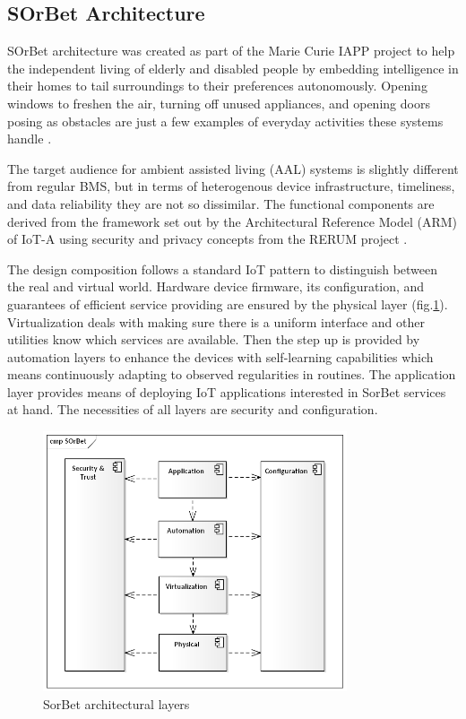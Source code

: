 \documentclass[11pt, english, a4paper, twoside]{article}
\begin{document}
\subsection{SOrBet Architecture}
SOrBet architecture was created as part of the Marie Curie IAPP project to help the independent living of elderly and disabled people by embedding intelligence in their homes to tail surroundings to their preferences autonomously. Opening windows to freshen the air, turning off unused appliances, and opening doors posing as obstacles are just a few examples of everyday activities these systems handle \cite{tragos_iot_2015}.

The target audience for ambient assisted living (AAL) systems is slightly different from regular BMS, but in terms of heterogenous device infrastructure, timeliness, and data reliability they are not so dissimilar. The functional components are derived from the framework set out by the Architectural Reference Model (ARM) of IoT-A using security and privacy concepts from the RERUM project \cite{rerum}.

The design composition follows a standard IoT pattern to distinguish between the real and virtual world. Hardware device firmware, its configuration, and guarantees of efficient service providing are ensured by the physical layer (fig.\ref{fig:sorbet}). Virtualization deals with making sure there is a uniform interface and other utilities know which services are available. Then the step up is provided by automation layers to enhance the devices with self-learning capabilities which means continuously adapting to observed regularities in routines. The application layer provides means of deploying IoT applications interested in SorBet services at hand. The necessities of all layers are security and configuration.

\begin{figure}
	\centering
	\includegraphics[width=0.8\textwidth]{SorBet.png}
	\caption{SorBet architectural layers}
	\label{fig:sorbet}
\end{figure}
\end{document}
